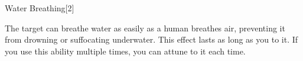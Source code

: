 \begin{spellsection}{Water Breathing}[2]

\begin{spellcontent}

\begin{spelltargetinginfo}



\end{spelltargetinginfo}


\begin{spelleffects}



\spelleffect
The target can breathe water as easily as a human breathes air, preventing it from drowning or suffocating underwater.
This effect lasts as long as you  to it.
If you use this ability multiple times, you can attune to it each time.








\end{spelleffects}

\end{spellcontent}
\begin{spellfooter}


\end{spellfooter}
\begin{spellsubcontent}


\end{spellsubcontent}
\end{spellsection}


